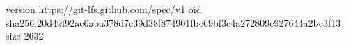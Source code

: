 version https://git-lfs.github.com/spec/v1
oid sha256:20d49f92ac6aba378d7c39d38f874901fbc69bf3c4a272809c927644a2bc3f13
size 2632
